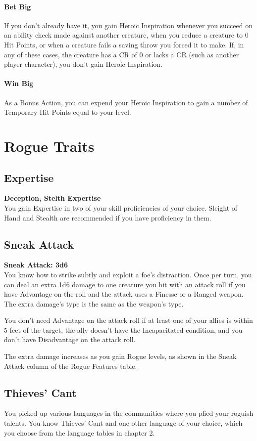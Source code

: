 \documentclass[letterpaper,openany,oneside,twocolumn]{book}
\begin{document}
\paragraph*{Bet Big} If you don't already have it, you gain Heroic Inspiration whenever you succeed on an ability check made against another creature, when you reduce a creature to 0 Hit Points, or when a creature fails a saving throw you forced it to make. If, in any of these cases, the creature has a CR of 0 or lacks a CR (such as another player character), you don't gain Heroic Inspiration.
\paragraph*{Win Big} As a Bonus Action, you can expend your Heroic Inspiration to gain a number of Temporary Hit Points equal to your level.

\section*{Rogue Traits}
\subsection*{Expertise}
\textbf{Deception, Stelth Expertise}\\
You gain Expertise in two of your skill proficiencies of your choice. Sleight of Hand and Stealth are recommended if you have proficiency in them.
\subsection*{Sneak Attack}
\textbf{Sneak Attack: 3d6}\\
You know how to strike subtly and exploit a foe's distraction. Once per turn, you can deal an extra 1d6 damage to one creature you hit with an attack roll if you have Advantage on the roll and the attack uses a Finesse or a Ranged weapon. The extra damage's type is the same as the weapon's type.

You don't need Advantage on the attack roll if at least one of your allies is within 5 feet of the target, the ally doesn't have the Incapacitated condition, and you don't have Disadvantage on the attack roll.

The extra damage increases as you gain Rogue levels, as shown in the Sneak Attack column of the Rogue Features table.
\subsection*{Thieves' Cant}
You picked up various languages in the communities where you plied your roguish talents. You know Thieves' Cant and one other language of your choice, which you choose from the language tables in chapter 2.
\end{document}
